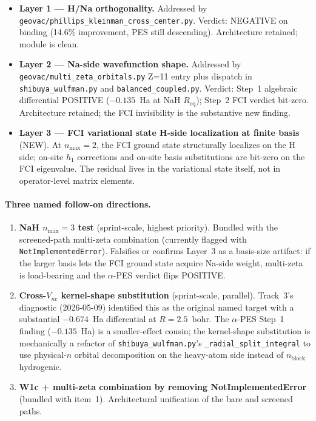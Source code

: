\documentclass[aps,pra,twocolumn,superscriptaddress,longbibliography]{revtex4-2}
\begin{document}
\begin{itemize}
  \item \textbf{Layer 1 — H/Na orthogonality.}
    Addressed by
    \texttt{geovac/phillips\_kleinman\_cross\_center.py}.
    Verdict: NEGATIVE on binding (14.6\% improvement, PES still
    descending).  Architecture retained; module is clean.
  \item \textbf{Layer 2 — Na-side wavefunction shape.}
    Addressed by \texttt{geovac/multi\_zeta\_orbitals.py} Z=11 entry
    plus dispatch in \texttt{shibuya\_wulfman.py} and
    \texttt{balanced\_coupled.py}.
    Verdict: Step~1 algebraic differential POSITIVE
    ($-0.135$~Ha at NaH $R_\text{eq}$); Step~2 FCI verdict bit-zero.
    Architecture retained; the FCI invisibility is the substantive
    new finding.
  \item \textbf{Layer 3 — FCI variational state H-side localization
    at finite basis} (NEW).  At $n_{\max}=2$, the FCI ground state
    structurally localizes on the H side; on-site $h_1$ corrections
    and on-site basis substitutions are bit-zero on the FCI
    eigenvalue.  The residual lives in the variational state itself,
    not in operator-level matrix elements.
\end{itemize}

\paragraph{Three named follow-on directions.}
\begin{enumerate}
  \item \textbf{NaH $n_{\max}=3$ test} (sprint-scale, highest priority).
    Bundled with the screened-path multi-zeta combination (currently
    flagged with \texttt{NotImplementedError}).  Falsifies or confirms
    Layer~3 as a basis-size artifact: if the larger basis lets the FCI
    ground state acquire Na-side weight, multi-zeta is load-bearing
    and the $\alpha$-PES verdict flips POSITIVE.
  \item \textbf{Cross-$V_{ne}$ kernel-shape substitution}
    (sprint-scale, parallel).  Track~3's diagnostic (2026-05-09)
    identified this as the original named target with a substantial
    $-0.674$~Ha differential at $R = 2.5$~bohr.  The $\alpha$-PES Step~1
    finding ($-0.135$~Ha) is a smaller-effect cousin; the
    kernel-shape substitution is mechanically a refactor of
    \texttt{shibuya\_wulfman.py}'s \texttt{\_radial\_split\_integral}
    to use physical-$n$ orbital decomposition on the heavy-atom side
    instead of $n_\text{block}$ hydrogenic.
  \item \textbf{W1c + multi-zeta combination by removing
    NotImplementedError} (bundled with item~1).
    Architectural unification of the bare and screened paths.
\end{enumerate}
\end{document}
